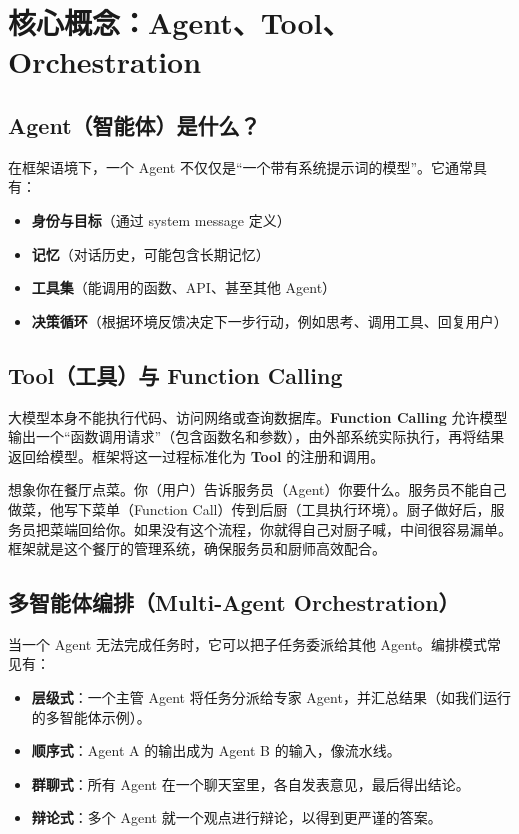 \documentclass[11pt,a4paper]{article}
\begin{document}
\section{核心概念：Agent、Tool、Orchestration}
\subsection{Agent（智能体）是什么？}
在框架语境下，一个 Agent 不仅仅是“一个带有系统提示词的模型”。它通常具有：
\begin{itemize}
    \item \textbf{身份与目标}（通过 system message 定义）
    \item \textbf{记忆}（对话历史，可能包含长期记忆）
    \item \textbf{工具集}（能调用的函数、API、甚至其他 Agent）
    \item \textbf{决策循环}（根据环境反馈决定下一步行动，例如思考、调用工具、回复用户）
\end{itemize}

\subsection{Tool（工具）与 Function Calling}
大模型本身不能执行代码、访问网络或查询数据库。\textbf{Function Calling} 允许模型输出一个“函数调用请求”（包含函数名和参数），由外部系统实际执行，再将结果返回给模型。框架将这一过程标准化为 \textbf{Tool} 的注册和调用。

\begin{tcolorbox}[breakable, colback=blue!5!white, colframe=blue!75!black, title=生动理解：餐厅点菜]
想象你在餐厅点菜。你（用户）告诉服务员（Agent）你要什么。服务员不能自己做菜，他写下菜单（Function Call）传到后厨（工具执行环境）。厨子做好后，服务员把菜端回给你。如果没有这个流程，你就得自己对厨子喊，中间很容易漏单。框架就是这个餐厅的管理系统，确保服务员和厨师高效配合。
\end{tcolorbox}

\subsection{多智能体编排（Multi-Agent Orchestration）}
当一个 Agent 无法完成任务时，它可以把子任务委派给其他 Agent。编排模式常见有：
\begin{itemize}
    \item \textbf{层级式}：一个主管 Agent 将任务分派给专家 Agent，并汇总结果（如我们运行的多智能体示例）。
    \item \textbf{顺序式}：Agent A 的输出成为 Agent B 的输入，像流水线。
    \item \textbf{群聊式}：所有 Agent 在一个聊天室里，各自发表意见，最后得出结论。
    \item \textbf{辩论式}：多个 Agent 就一个观点进行辩论，以得到更严谨的答案。
\end{itemize}
\end{document}
